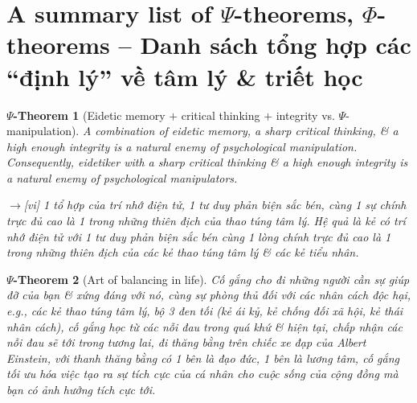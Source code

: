 \documentclass[12pt,twoside]{book}
\newtheorem{psy-theorem}{$\Psi$-Theorem}
\begin{document}
\section{A summary list of $\Psi$-theorems, $\Phi$-theorems -- Danh sách tổng hợp các ``định lý'' về tâm lý \& triết học}

\begin{psy-theorem}[Eidetic memory $+$ critical thinking $+$ integrity vs. $\Psi$-manipulation]
	A combination of eidetic memory, a sharp critical thinking, \& a high enough integrity is a natural enemy of psychological manipulation. Consequently, eidetiker with a sharp critical thinking \& a high enough integrity is a natural enemy of psychological manipulators.
	
	{\sf[en]$\to$[vi]} 1 tổ hợp của trí nhớ điện tử, 1 tư duy phản biện sắc bén, cùng 1 sự chính trực đủ cao là 1 trong những thiên địch của thao túng tâm lý. Hệ quả là kẻ có trí nhớ điện tử với 1 tư duy phản biện sắc bén cùng 1 lòng chính trực đủ cao là 1 trong những thiên địch của các kẻ thao túng tâm lý \& các kẻ tiểu nhân.
\end{psy-theorem}

\begin{psy-theorem}[Art of balancing in life]
	Cố gắng cho đi những người cần sự giúp đỡ của bạn \& xứng đáng với nó, cùng sự phòng thủ đối với các nhân cách độc hại, e.g., các kẻ thao túng tâm lý, bộ 3 đen tối (kẻ ái kỷ, kẻ chống đối xã hội, kẻ thái nhân cách), cố gắng học từ các nỗi đau trong quá khứ \& hiện tại, chấp nhận các nỗi đau sẽ tới trong tương lai, đi thăng bằng trên chiếc xe đạp của {\sc Albert Einstein}, với thanh thăng bằng có 1 bên là đạo đức, 1 bên là lương tâm, cố gắng tối ưu hóa việc tạo ra sự tích cực của cá nhân cho cuộc sống của cộng đồng mà bạn có ảnh hưởng tích cực tới.
\end{psy-theorem}
\end{document}
